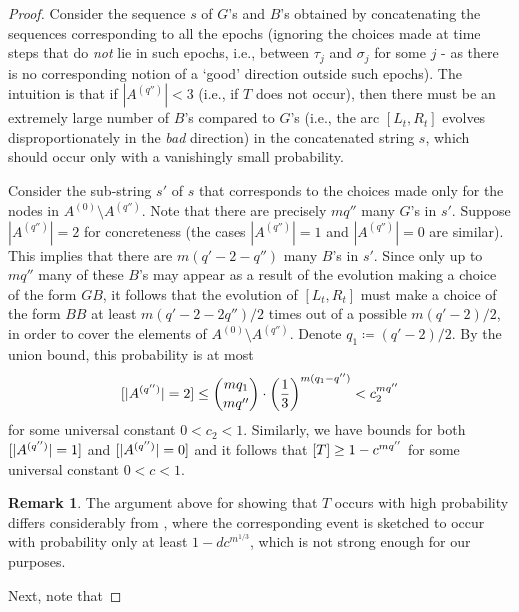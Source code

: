 \documentclass[10pt,a4paper]{article}
\theoremstyle{definition}%
\newtheorem{remark}[theorem]{Remark}
\theoremstyle{plain}
\let\Pr\relax
\DeclareMathOperator*{\Pr}{\mathbb{P}}
\begin{document}
\begin{proof}
Consider the sequence $s$ of $G$'s and $B$'s obtained by concatenating the sequences corresponding to all the epochs (ignoring the choices made at time steps that do \emph{not} lie in such epochs, i.e., between $\tau_j$ and $\sigma_j$ for some $j$ - as there is no corresponding notion of a `good' direction outside such epochs). The intuition is that if $|A^{(q'')}| < 3$ (i.e., if $T$ does not occur), then there must be an extremely large number of $B$'s compared to $G$'s (i.e., the arc $[L_t,R_t]$ evolves disproportionately in the \emph{bad} direction) in the concatenated string $s$, which should occur only with a vanishingly small probability.

Consider the sub-string $s'$ of $s$ that corresponds to the choices made only for the nodes in $A^{(0)}\setminus A^{(q'')}$. Note that there are precisely $mq''$ many $G$'s in $s'$. Suppose $|A^{(q'')}| = 2$ for concreteness (the cases $|A^{(q'')}| = 1$ and $|A^{(q'')}| = 0$ are similar). This implies that there are $m(q' - 2 - q'')$ many $B$'s in $s'$. Since only up to $mq''$ many of these $B$'s may appear as a result of the evolution making a choice of the form $GB$, it follows that the evolution of $[L_t,R_t]$ must make a choice of the form $BB$ at least $m(q' - 2 - 2q'')/2$ times out of a possible $m(q' - 2)/2$, in order to cover the elements of $A^{(0)}\setminus A^{(q'')}$. Denote $q_1 \coloneqq (q' - 2)/2$. By the union bound, this probability is at most 
\[
\Pr[|A^{(q'')}| = 2] \leq \binom{mq_1}{mq''}\cdot \left(\frac{1}{3}\right)^{m(q_1 - q'')} < c_2^{mq''}
\]
for some universal constant $0<c_2<1$. Similarly, we have bounds for both $\Pr[|A^{(q'')}| = 1]$ and $\Pr[|A^{(q'')}| = 0]$ and it follows that $\Pr[T] \geq 1 - c^{mq''}$ for some universal constant $0<c<1$. 

\begin{remark}
The argument above for showing that $T$ occurs with high probability differs considerably from \cite{DvirMPY12}, where the corresponding event is sketched to occur with probability only at least $1-dc^{m^{1/3}}$, which is not strong enough for our purposes.  
\end{remark}

Next, note that


\end{proof}
\end{document}
